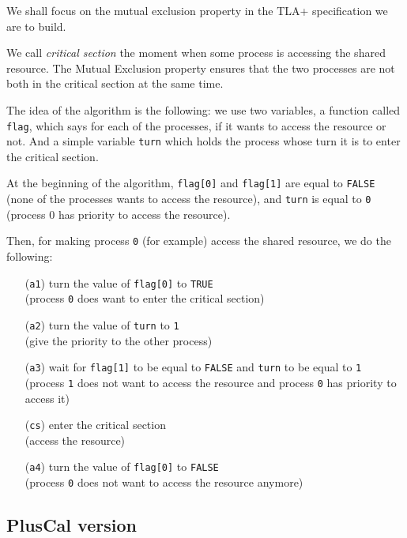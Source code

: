 \documentclass{enonce}
\begin{document}
\noindent We shall focus on the mutual exclusion property in the TLA+ specification we are to build.

\medskip

\noindent We call \textit{critical section} the moment when some process is accessing the shared resource. The Mutual Exclusion property ensures that the two processes are not both in the critical section at the same time.

\medskip

 The idea of the algorithm is the following: we use two variables, a function called {\tt flag}, which says for each of the processes, if it wants to access the resource or not. And a simple variable {\tt turn} which holds the process whose turn it is to enter the critical section.

\noindent At the beginning of the algorithm, {\tt flag[0]} and {\tt flag[1]} are equal to {\tt FALSE} (none of the processes wants to access the resource), and {\tt turn} is equal to {\tt 0} (process 0 has priority to access the resource).

\noindent Then, for making process {\tt 0} (for example) access the shared resource, we do the following:
\begin{enumerate}
	\item[({\tt a1})] turn the value of {\tt flag[0]} to {\tt TRUE} \\(process {\tt 0} does want to enter the critical section)
	\item[({\tt a2})] turn the value of {\tt turn} to {\tt 1} \\(give the priority to the other process)
	\item[({\tt a3})] wait for  {\tt flag[1]} to be equal to {\tt FALSE} and {\tt turn} to be equal to {\tt 1} \\(process {\tt 1} does not want to access the resource and process {\tt 0} has priority to access it)
	\item[({\tt cs})] enter the critical section \\(access the resource)
	\item[({\tt a4})] turn  the value of {\tt flag[0]} to {\tt FALSE} \\(process {\tt 0} does not want to access the resource anymore)
\end{enumerate}   

\medskip


\subsection{PlusCal version}
\end{document}
